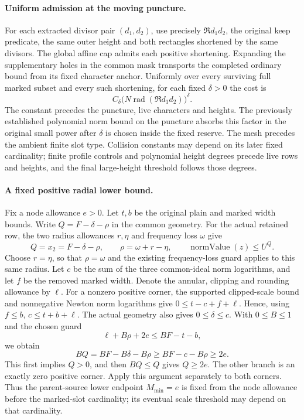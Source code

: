 \paragraph{Uniform admission at the moving puncture.}
For each extracted divisor pair \((d_1,d_2)\), use precisely
\(\mathfrak R d_1d_2\), the original keep predicate, the same outer
height and both rectangles shortened by the same divisors. The global
affine cap admits each positive shortening. Expanding the supplementary
holes in the common mask transports the completed ordinary bound from
its fixed character anchor. Uniformly over every surviving full marked
subset and every such shortening, for each fixed \(\delta>0\) the cost is
\[
 C_\delta\bigl(N\operatorname{rad}(\mathfrak R d_1d_2)\bigr)^\delta.
\]
The constant precedes the puncture, live characters and heights. The
previously established polynomial norm bound on the puncture absorbs
this factor in the original small power after \(\delta\) is chosen
inside the fixed reserve. The mesh precedes the ambient finite slot
type. Collision constants may depend on its later fixed cardinality;
finite profile controls and polynomial height degrees precede live rows
and heights, and the final large-height threshold follows those degrees.

\paragraph{A fixed positive radial lower bound.}
Fix a node allowance \(e>0\). Let \(t,b\) be the original plain
and marked width bounds. Write \(Q=F-\delta-\rho\) in the common
geometry. For the actual retained row, the two radius allowances \(r,\eta\)
and frequency loss \(\omega\) give
\[
 Q=x_2=F-\delta-\rho,\qquad \rho=\omega+r-\eta,
 \qquad \operatorname{normValue}(z)\le U^Q.
\]
Choose \(r=\eta\), so that \(\rho=\omega\) and the existing frequency-loss
guard applies to this same radius. Let \(c\) be the sum of the three
common-ideal norm logarithms, and let \(f\) be the removed marked
width. Denote the annular, clipping and rounding allowance by
\(\ell\). For a nonzero positive corner, the supported clipped-scale
bound and nonnegative Newton norm logarithms give
\(0\le t-c+f+\ell\). Hence, using \(f\le b\),
\(c\le t+b+\ell\). The actual geometry also gives
\(0\le\delta\le c\). With \(0\le B\le1\) and the chosen guard
\[
 \ell+B\rho+2e\le BF-t-b,
\]
we obtain
\[
 BQ=BF-B\delta-B\rho
 \ge BF-c-B\rho\ge2e.
\]
This first implies \(Q>0\), and then \(BQ\le Q\) gives
\(Q\ge2e\). The other branch is an exactly zero positive corner.
Apply this argument separately to both corners. Thus the parent-source
lower endpoint \(M_{\min}=e\) is fixed from the node allowance
before the marked-slot cardinality; its eventual scale threshold may
depend on that cardinality.

